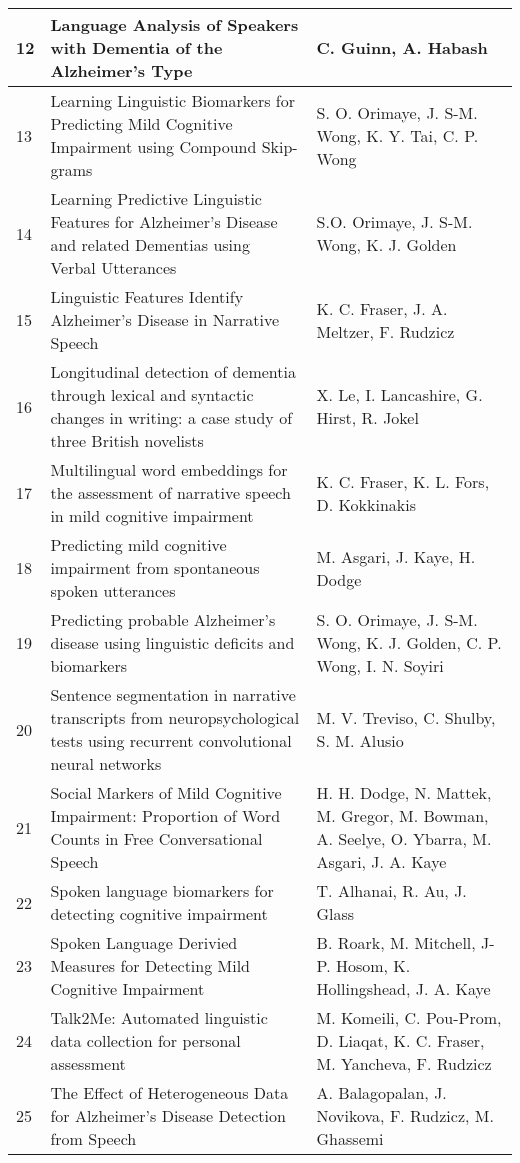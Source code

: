 \documentclass[12pt]{article}
\begin{document}
\begin{longtable}{ p{1cm} | p{6cm} | p{6cm}}
	12 & Language Analysis of Speakers with Dementia of the Alzheimer’s Type & C. Guinn, A. Habash \\ \hline
	13 & Learning Linguistic Biomarkers for Predicting Mild Cognitive Impairment using Compound Skip-grams & S. O. Orimaye, J. S-M. Wong, K. Y. Tai, C. P. Wong \\ \hline
	14 & Learning Predictive Linguistic Features for Alzheimer’s Disease and related Dementias using Verbal Utterances & S.O. Orimaye, J. S-M. Wong, K. J. Golden \\ \hline
	15 & Linguistic Features Identify Alzheimer's Disease in Narrative Speech & K. C. Fraser, J. A. Meltzer, F. Rudzicz \\ \hline
	16 & Longitudinal detection of dementia through lexical and syntactic changes in writing: a case study of three British novelists & X. Le, I. Lancashire, G. Hirst, R. Jokel \\ \hline
	17 & Multilingual word embeddings for the assessment of narrative speech in mild cognitive impairment &  K. C. Fraser, K. L. Fors, D. Kokkinakis \\ \hline
	18 & Predicting mild cognitive impairment from spontaneous spoken utterances & M. Asgari, J. Kaye, H. Dodge \\ \hline
	19 & Predicting probable Alzheimer's disease using linguistic deficits and biomarkers & S. O. Orimaye, J. S-M. Wong, K. J. Golden, C. P. Wong, I. N. Soyiri \\ \hline
	20 & Sentence segmentation in narrative transcripts from neuropsychological tests using recurrent convolutional neural networks & M. V. Treviso, C. Shulby, S. M. Alusio \\ \hline
	21 & Social Markers of Mild Cognitive Impairment: Proportion of Word Counts in Free Conversational Speech & H. H. Dodge, N. Mattek, M. Gregor, M. Bowman, A. Seelye, O. Ybarra, M. Asgari, J. A. Kaye \\ \hline
	22 & Spoken language biomarkers for detecting cognitive impairment & T. Alhanai, R. Au, J. Glass \\ \hline
	23 & Spoken Language Derivied Measures for Detecting Mild Cognitive Impairment & B. Roark, M. Mitchell, J-P. Hosom, K. Hollingshead, J. A. Kaye \\ \hline
	24 & Talk2Me: Automated linguistic data collection for personal assessment & M. Komeili, C. Pou-Prom, D. Liaqat, K. C. Fraser, M. Yancheva, F. Rudzicz \\ \hline
	25 & The Effect of Heterogeneous Data for Alzheimer’s Disease Detection from Speech & A. Balagopalan, J. Novikova, F. Rudzicz, M. Ghassemi \\ \hline

\end{longtable}
\end{document}
